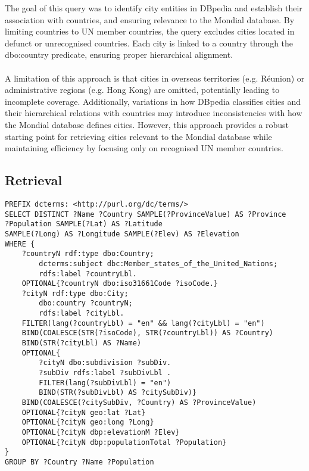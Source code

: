 \documentclass[11pt]{article}
\begin{document}
The goal of this query was to identify city entities in DBpedia and establish their association with countries, and ensuring relevance to the Mondial
database. By limiting countries to UN member countries, the query excludes cities located in defunct or unrecognised countries. Each city is
linked to a country through the dbo:country predicate, ensuring proper hierarchical alignment.
\\ \\
A limitation of this approach is that cities in overseas territories (e.g. Réunion) or administrative regions (e.g. Hong Kong) are omitted,
potentially leading to incomplete coverage. Additionally, variations in how DBpedia classifies cities and their hierarchical relations
with countries may introduce inconsistencies with how the Mondial database defines cities. However, this approach provides a robust starting point
for retrieving cities relevant to the Mondial database while maintaining efficiency by focusing only on recognised UN member countries.

\subsection{Retrieval}
{\footnotesize\begin{verbatim}
PREFIX dcterms: <http://purl.org/dc/terms/>
SELECT DISTINCT ?Name ?Country SAMPLE(?ProvinceValue) AS ?Province
?Population SAMPLE(?Lat) AS ?Latitude
SAMPLE(?Long) AS ?Longitude SAMPLE(?Elev) AS ?Elevation
WHERE {
    ?countryN rdf:type dbo:Country;
        dcterms:subject dbc:Member_states_of_the_United_Nations;
        rdfs:label ?countryLbl.
    OPTIONAL{?countryN dbo:iso31661Code ?isoCode.}
    ?cityN rdf:type dbo:City;
        dbo:country ?countryN;
        rdfs:label ?cityLbl.
    FILTER(lang(?countryLbl) = "en" && lang(?cityLbl) = "en")
    BIND(COALESCE(STR(?isoCode), STR(?countryLbl)) AS ?Country)
    BIND(STR(?cityLbl) AS ?Name)
    OPTIONAL{ 
        ?cityN dbo:subdivision ?subDiv.
        ?subDiv rdfs:label ?subDivLbl .
        FILTER(lang(?subDivLbl) = "en")
        BIND(STR(?subDivLbl) AS ?citySubDiv)}
    BIND(COALESCE(?citySubDiv, ?Country) AS ?ProvinceValue)
    OPTIONAL{?cityN geo:lat ?Lat}
    OPTIONAL{?cityN geo:long ?Long}
    OPTIONAL{?cityN dbp:elevationM ?Elev}
    OPTIONAL{?cityN dbp:populationTotal ?Population}
}
GROUP BY ?Country ?Name ?Population
\end{verbatim}}
\end{document}
